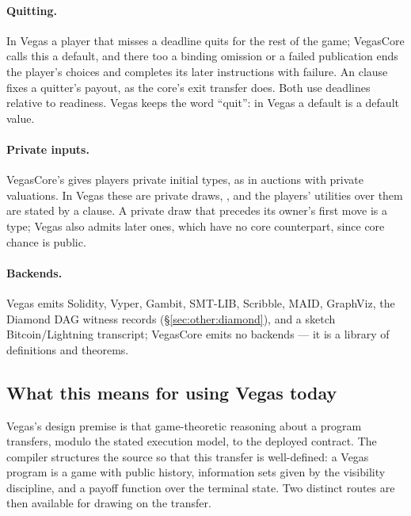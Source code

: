 \paragraph{Quitting.}  In Vegas a player that misses a deadline
quits for the rest of the game; VegasCore calls this a default, and
there too a binding omission or a failed publication ends the
player's choices and completes its later instructions with failure.
An  clause fixes a quitter's payout, as the core's exit
transfer does.  Both use deadlines relative to readiness.  Vegas
keeps the word ``quit'': in Vegas a default is a default value.

\paragraph{Private inputs.}  VegasCore's  gives players
private initial types, as in auctions with private valuations.  In
Vegas these are private draws, , and the
players' utilities over them are stated by a  clause.
A private draw that precedes its owner's first move is a 
type; Vegas also admits later ones, which have no core counterpart,
since core chance is public.

\paragraph{Backends.}  Vegas emits Solidity, Vyper, Gambit,
SMT-LIB, Scribble, MAID, GraphViz, the Diamond DAG witness
records (\S\ref{sec:other:diamond}), and a sketch
Bitcoin/Lightning transcript; VegasCore emits no backends ---
it is a library of definitions and theorems.

\subsection{What this means for using Vegas today}
\label{sec:vegascore:status}

Vegas's design premise is that game-theoretic reasoning about a
program transfers, modulo the stated execution model, to the
deployed contract.  The compiler structures the source so that
this transfer is well-defined: a Vegas program is a game with
public history, information sets given by the visibility
discipline, and a payoff function over the terminal state.  Two
distinct routes are then available for drawing on the transfer.

